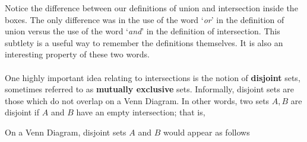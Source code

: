 Notice the difference between our definitions of union and intersection inside the boxes. The only difference was in the use of the word `\textit{or}' in the definition of union versus the use of the word `\textit{and}' in the definition of intersection. This subtlety is a useful way to remember the definitions themselves. It is also an interesting property of these two words. \\ \\

\noindent One highly important idea relating to intersections is the notion of \textbf{disjoint} \label{disjoint} sets, sometimes referred to as \textbf{mutually exclusive} sets. \label{mutually exclusive} Informally, disjoint sets are those which do not overlap on a Venn Diagram. In other words, two sets $A,B$ are disjoint if $A$ and $B$ have an empty intersection; that is,
\bigskip

\hfil{}
\bigskip

\noindent On a Venn Diagram, disjoint sets $A$ and $B$ would appear as follows

	\begin{figure}[h!]
	\centering
	\end{figure}


\newpage
